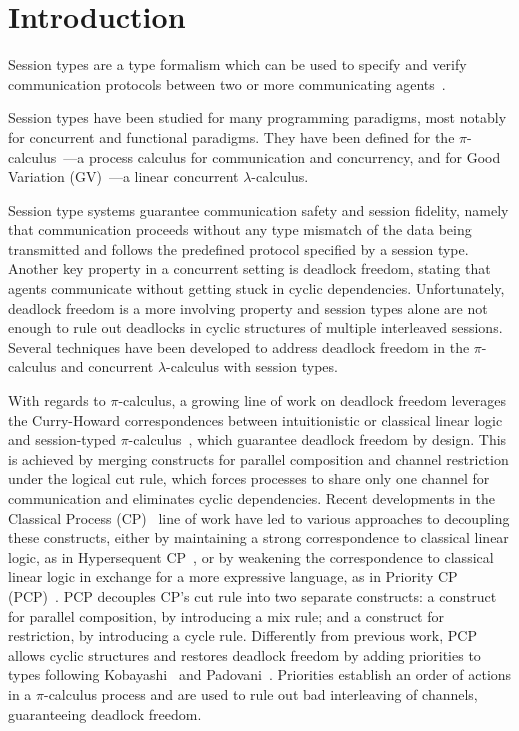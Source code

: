 \documentclass[main.tex]{subfiles}
\begin{document}
\section{Introduction}
Session types are a type formalism which can be used to specify and verify communication protocols between two or more communicating agents~\cite{honda93,takeuchihonda94,hondavasconcelos98,carbonehonda07}.

Session types have been studied for many programming paradigms, most notably for concurrent and functional paradigms. They have been defined for the $\pi$-calculus~\cite{sangiorgiwalker01}---a process calculus for communication and concurrency, and for Good Variation (GV)~\cite{wadler14,lindleymorris15}---a linear concurrent $\lambda$-calculus.

Session type systems guarantee communication safety and session fidelity, namely that communication proceeds without any type mismatch of the data being transmitted and follows the predefined protocol specified by a session type.
Another key property in a concurrent setting is deadlock freedom, stating that agents communicate without getting stuck in cyclic dependencies. Unfortunately, deadlock freedom is a more involving property and session types alone are not enough to rule out deadlocks in cyclic structures of multiple interleaved sessions. Several techniques have been developed to address deadlock freedom in the $\pi$-calculus and concurrent $\lambda$-calculus with session types.

With regards to $\pi$-calculus, a growing line of work on deadlock freedom leverages the Curry-Howard correspondences between intuitionistic or classical linear logic and session-typed $\pi$-calculus~\cite{cairespfenning10,wadler14}, which guarantee deadlock freedom by design. This is achieved by merging constructs for parallel composition and channel restriction under the logical cut rule, which forces processes to share only one channel for communication and eliminates cyclic dependencies. Recent developments in the Classical Process (CP)~\cite{wadler14} line of work have led to various approaches to decoupling these constructs, either by maintaining a strong correspondence to classical linear logic, as in Hypersequent CP~\cite{kokkemontesi19popl,kokkemontesi19tlla}, or by weakening the correspondence to classical linear logic in exchange for a more expressive language, as in Priority CP (PCP)~\cite{dardhagay18}. PCP decouples CP's cut rule into two separate constructs: a construct for parallel composition, by introducing a mix rule; and a construct for restriction, by introducing a cycle rule. Differently from previous work, PCP allows cyclic structures and restores deadlock freedom by adding priorities to types following Kobayashi~\cite{kobayashi06} and Padovani~\cite{padovani14}. Priorities establish an order of actions in a $\pi$-calculus process and are used to rule out bad interleaving of channels, guaranteeing deadlock freedom.
\end{document}
